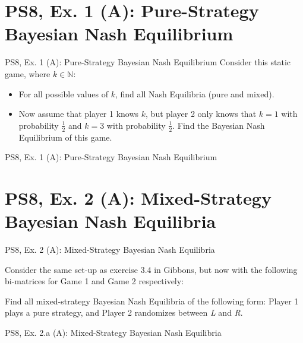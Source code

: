 \section{PS8, Ex. 1 (A): Pure-Strategy Bayesian Nash Equilibrium}

\begin{frame}{PS8, Ex. 1 (A): Pure-Strategy Bayesian Nash Equilibrium}
  Consider this static game, where $k\in\mathbb{N}:$

  \begin{itemize}
    \item[(a)] For all possible values of $k$, find all Nash Equilibria (pure and mixed).
    \item[(b)] Now assume that player 1 knows $k$, but player 2 only knows that $k = 1$ with probability $\frac{1}{2}$ and $k = 3$ with probability $\frac{1}{2}$. Find the Bayesian Nash Equilibrium of this game.
  \end{itemize}
\end{frame}

\begin{frame}{PS8, Ex. 1 (A): Pure-Strategy Bayesian Nash Equilibrium}
  \begin{multicols}{2}
    \vfill\null\columnbreak
    \vfill\null
  \end{multicols}

\end{frame}



\section{PS8, Ex. 2 (A): Mixed-Strategy Bayesian Nash Equilibria}

\begin{frame}{PS8, Ex. 2 (A): Mixed-Strategy Bayesian Nash Equilibria}
  \begin{multicols}{2}
    Consider the same set-up as exercise 3.4 in Gibbons, but now with the following bi-matrices for Game 1 and Game 2 respectively:

    Find all mixed-strategy Bayesian Nash Equilibria of the following form: Player 1 plays a pure strategy, and Player 2 randomizes between \textit{L} and \textit{R}.
    \vfill\null\columnbreak
    \vfill\null
  \end{multicols}
\end{frame}

\begin{frame}{PS8, Ex. 2.a (A): Mixed-Strategy Bayesian Nash Equilibria}
  \begin{multicols}{2}
    \vfill\null\columnbreak
    \vfill\null
  \end{multicols}
\end{frame}
